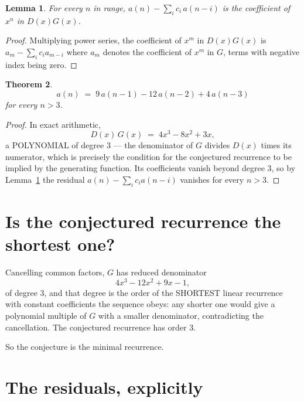 \documentclass[11pt,a4paper]{article}
\theoremstyle{plain}
\newtheorem{theorem}{Theorem}
\newtheorem{lemma}[theorem]{Lemma}
\theoremstyle{definition}
\begin{document}
\begin{lemma}\label{lem:key}
For every $n$ in range, $a(n)-\sum_i c_i\,a(n-i)$ is the coefficient of $x^{n}$ in
$D(x)G(x)$.
\end{lemma}

\begin{proof}
Multiplying power series, the coefficient of $x^{m}$ in $D(x)G(x)$ is
$a_m-\sum_i c_i a_{m-i}$ where $a_m$ denotes the coefficient of $x^{m}$ in $G$, terms with
negative index being zero.
\end{proof}

\begin{theorem}
\[
a(n)\;=\;9\,a(n-1) - 12\,a(n-2) + 4\,a(n-3)
\]
for every $n>3$.
\end{theorem}

\begin{proof}
In exact arithmetic,
\[
D(x)\,G(x)\;=\;4 x^{3} - 8 x^{2} + 3 x,
\]
a POLYNOMIAL of degree $3$ --- the denominator of $G$ divides $D(x)$ times its numerator,
which is precisely the condition for the conjectured recurrence to be implied by the
generating function. Its coefficients vanish beyond degree $3$, so by
Lemma~\ref{lem:key} the residual $a(n)-\sum_ic_ia(n-i)$ vanishes for every
$n>3$.
\end{proof}

\section{Is the conjectured recurrence the shortest one?}

Cancelling common factors, $G$ has reduced denominator
\[
4 x^{3} - 12 x^{2} + 9 x - 1,
\]
of degree $3$, and that degree is the order of the SHORTEST linear recurrence with
constant coefficients the sequence obeys: any shorter one would give a polynomial multiple of
$G$ with a smaller denominator, contradicting the cancellation. The conjectured recurrence has
order $3$.

So the conjecture is the minimal recurrence.

\section{The residuals, explicitly}
\end{document}
